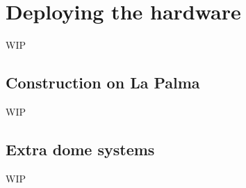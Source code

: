 \section{Deploying the hardware}
\label{sec:hardware}
\begin{colsection}


\begin{colsection}

WIP

\end{colsection}


\subsection{Construction on La Palma}
\label{sec:construction}
\begin{colsection}

WIP

\end{colsection}


\subsection{Extra dome systems}
\label{sec:arduino}
\begin{colsection}

WIP

\end{colsection}


\end{colsection}

